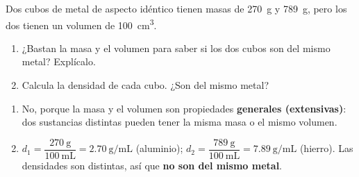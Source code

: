 \begin{exercise}
    Dos cubos de metal de aspecto idéntico tienen masas de \qty{270}{\g} y \qty{789}{\g}, pero los dos tienen un volumen de \qty{100}{\cubic\cm}.
    \begin{enumerate}[label=\letraminuscula]
        \item ¿Bastan la masa y el volumen para saber si los dos cubos son del mismo metal? Explícalo.
        \item Calcula la densidad de cada cubo. ¿Son del mismo metal?
    \end{enumerate}
    \begin{solu}
        \begin{enumerate}[label=\alph*)]
            \item No, porque la masa y el volumen son propiedades \textbf{generales (extensivas)}: dos sustancias distintas pueden tener la misma masa o el mismo volumen.
            \item \(d_1 = \dfrac{\qty{270}{\g}}{\qty{100}{\mL}} = \qty{2.70}{\g\per\mL}\) (aluminio); \(d_2 = \dfrac{\qty{789}{\g}}{\qty{100}{\mL}} = \qty{7.89}{\g\per\mL}\) (hierro). Las densidades son distintas, así que \textbf{no son del mismo metal}.
        \end{enumerate}
    \end{solu}
\end{exercise}

